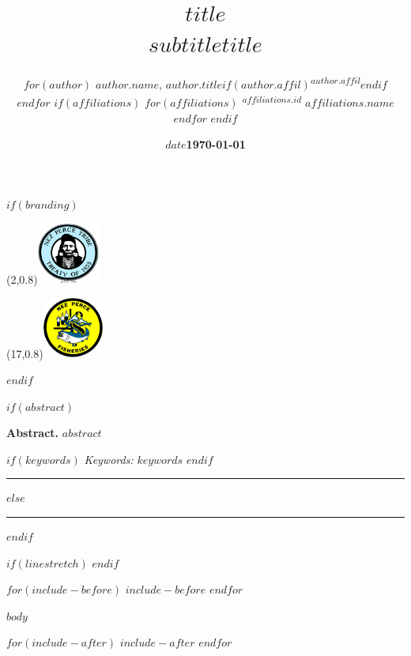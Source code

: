 \documentclass[$if(fontsize)$$fontsize$$else$11pt$endif$,a4paper]{article}
\title{$title$ \\[1em] \large $subtitle$}
\title{$title$}
\author{}
\author{%
$for(author)$
\textbf{$author.name$}, \emph{$author.title$}$if(author.affil)$\textsuperscript{$author.affil$}$endif$\\[0.5em]
$endfor$
$if(affiliations)$
$for(affiliations)$
\textsuperscript{$affiliations.id$} $affiliations.name$\\
$endfor$
$endif$
}
\date{\textbf{$date$}}
\date{\textbf{\today}}
\newenvironment{abstractbox}
  {\begin{tcolorbox}[colback=gray!5!white,colframe=gray!50!black,
  width=\textwidth, boxrule=1.0pt, sharp corners, left=4pt, right=4pt, top=4pt, bottom=4pt]}
  {\end{tcolorbox}}
\begin{document}

\maketitle

$if(branding)$
  \vspace*{-1.5cm}
  \begin{textblock}{4}(2,0.8)\includegraphics[height=2.0cm]{../templates/NPT.png}\end{textblock}
  \begin{textblock}{4}(17,0.8)\includegraphics[height=2.0cm]{../templates/DFRM.png}\end{textblock}
$endif$


$if(abstract)$
  \vspace{3em}
  \begin{abstractbox}
  \textbf{Abstract.} $abstract$

  $if(keywords)$
    \vspace{1em}
    \textit{Keywords:} $keywords$
  $endif$
  \end{abstractbox}
  \vspace{0.5em}
  \rule{\linewidth}{0.2pt}
$else$
  \vspace{1em}
  \rule{\linewidth}{0.2pt}
$endif$

$if(linestretch)$
$endif$

$for(include-before)$
$include-before$
$endfor$

$body$

\printbibliography

$for(include-after)$
$include-after$
$endfor$
\end{document}
